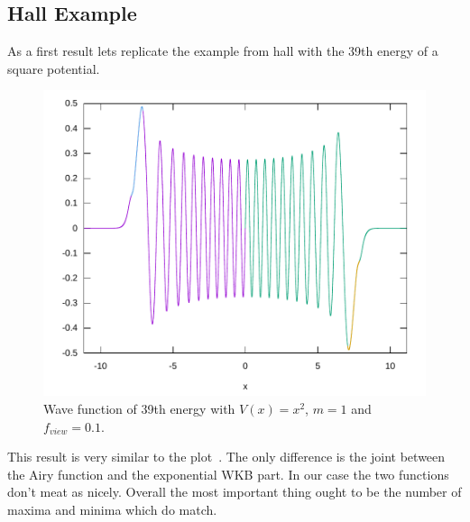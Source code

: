 \documentclass[11pt,DIV=10,final]{scrreprt} %
\begin{document}
{\subsection{Hall Example}\label{sec:resutl:hall}
As a first result lets replicate the example from hall with the 39th energy of a square potential.
\begin{figure}[H]
  \centering
  \includegraphics[width=\textwidth]{plots/square-39.pdf}
  \caption{Wave function of 39th energy with $V(x) = x^{2}$, $m = 1$ and $f_{view}=0.1$.}
\end{figure}
This result is very similar to the plot~\cite[fig. 15.5]{hall2013quantum}. The only difference is the joint between the Airy function and the exponential WKB part. In our case the two functions don't
meat as nicely.
Overall the most important thing ought to be the number of maxima and minima which do match.

}
\end{document}
